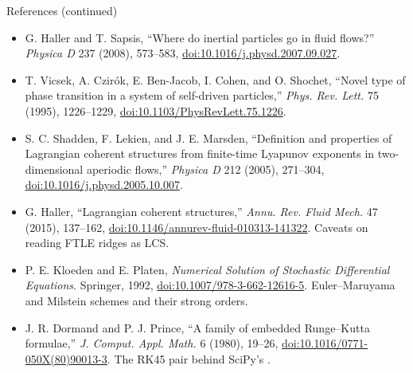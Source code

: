 \documentclass[aspectratio=169,11pt]{beamer}
\begin{document}
\begin{frame}{References (continued)}
\footnotesize
\begin{itemize}\itemsep3pt
  \item G. Haller and T. Sapsis, ``Where do inertial particles go in fluid flows?'' \emph{Physica D} 237 (2008), 573--583, \href{https://doi.org/10.1016/j.physd.2007.09.027}{doi:10.1016/j.physd.2007.09.027}.
  \item T. Vicsek, A. Czir\'ok, E. Ben-Jacob, I. Cohen, and O. Shochet, ``Novel type of phase transition in a system of self-driven particles,'' \emph{Phys. Rev. Lett.} 75 (1995), 1226--1229, \href{https://doi.org/10.1103/PhysRevLett.75.1226}{doi:10.1103/PhysRevLett.75.1226}.
  \item S. C. Shadden, F. Lekien, and J. E. Marsden, ``Definition and properties of Lagrangian coherent structures from finite-time Lyapunov exponents in two-dimensional aperiodic flows,'' \emph{Physica D} 212 (2005), 271--304, \href{https://doi.org/10.1016/j.physd.2005.10.007}{doi:10.1016/j.physd.2005.10.007}.
  \item G. Haller, ``Lagrangian coherent structures,'' \emph{Annu. Rev. Fluid Mech.} 47 (2015), 137--162, \href{https://doi.org/10.1146/annurev-fluid-010313-141322}{doi:10.1146/annurev-fluid-010313-141322}. Caveats on reading FTLE ridges as LCS.
  \item P. E. Kloeden and E. Platen, \emph{Numerical Solution of Stochastic Differential Equations}. Springer, 1992, \href{https://doi.org/10.1007/978-3-662-12616-5}{doi:10.1007/978-3-662-12616-5}. Euler--Maruyama and Milstein schemes and their strong orders.
  \item J. R. Dormand and P. J. Prince, ``A family of embedded Runge--Kutta formulae,'' \emph{J. Comput. Appl. Math.} 6 (1980), 19--26, \href{https://doi.org/10.1016/0771-050X(80)90013-3}{doi:10.1016/0771-050X(80)90013-3}. The RK45 pair behind SciPy's .
\end{itemize}
\end{frame}
\end{document}
